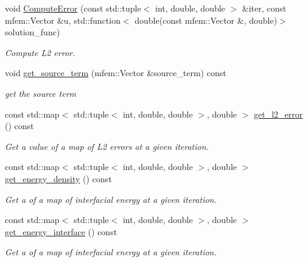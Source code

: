 \begin{DoxyCompactItemize}
void \hyperlink{classPhaseFieldOperatorBase_ae2166b96b4d740e05c5dd1ca36e9fc8c}{Compute\+Error} (const std\+::tuple$<$ int, double, double $>$ \&iter, const mfem\+::\+Vector \&u, std\+::function$<$ double(const mfem\+::\+Vector \&, double)$>$ solution\+\_\+func)
\begin{DoxyCompactList}\small\item\em Compute L2 error. \end{DoxyCompactList}\item 
void \hyperlink{classPhaseFieldOperatorBase_ade4aaf43e627fdc8b2a3690839e225d3}{get\+\_\+source\+\_\+term} (mfem\+::\+Vector \&source\+\_\+term) const
\begin{DoxyCompactList}\small\item\em get the source term \end{DoxyCompactList}\item 
const std\+::map$<$ std\+::tuple$<$ int, double, double $>$, double $>$ \hyperlink{classPhaseFieldOperatorBase_adc993d94274e82bc06f9555fbecbd310}{get\+\_\+l2\+\_\+error} () const
\begin{DoxyCompactList}\small\item\em Get a value of a map of L2 errors at a given iteration. \end{DoxyCompactList}\item 
const std\+::map$<$ std\+::tuple$<$ int, double, double $>$, double $>$ \hyperlink{classPhaseFieldOperatorBase_a8428da5d747f60f7ccbd79c879ca8d25}{get\+\_\+energy\+\_\+density} () const
\begin{DoxyCompactList}\small\item\em Get a of a map of interfacial energy at a given iteration. \end{DoxyCompactList}\item 
const std\+::map$<$ std\+::tuple$<$ int, double, double $>$, double $>$ \hyperlink{classPhaseFieldOperatorBase_ac194823660f85a12d8edcf4520bbc025}{get\+\_\+energy\+\_\+interface} () const
\begin{DoxyCompactList}\small\item\em Get a of a map of interfacial energy at a given iteration. \end{DoxyCompactList}\end{DoxyCompactItemize}
